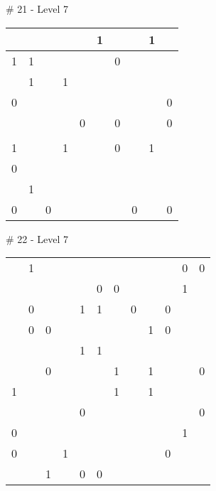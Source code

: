 \# 21 - Level 7 \newline
\begin{tabular}{|m{\collen}|m{\collen}|m{\collen}|m{\collen}|m{\collen}|m{\collen}|m{\collen}|m{\collen}|m{\collen}|m{\collen}|}
\hline
    &   &   &   &   & 1 &   &   & 1 &   \\
\hline
  1 & 1 &   &   &   &   & 0 &   &   &   \\
\hline
    & 1 &   & 1 &   &   &   &   &   &   \\
\hline
  0 &   &   &   &   &   &   &   &   & 0 \\
\hline
    &   &   &   & 0 &   & 0 &   &   & 0 \\
\hline
    &   &   &   &   &   &   &   &   &   \\
\hline
  1 &   &   & 1 &   &   & 0 &   & 1 &   \\
\hline
  0 &   &   &   &   &   &   &   &   &   \\
\hline
    & 1 &   &   &   &   &   &   &   &   \\
\hline
  0 &   & 0 &   &   &   &   & 0 &   & 0 \\
\hline
\end{tabular}


\medskip

\# 22 - Level 7 \newline
\begin{tabular}{|m{\collen}|m{\collen}|m{\collen}|m{\collen}|m{\collen}|m{\collen}|m{\collen}|m{\collen}|m{\collen}|m{\collen}|m{\collen}|m{\collen}|}
\hline
    &   &   &   &   &   &   &   &   &   &   &   \\
\hline
    & 1 &   &   &   &   &   &   &   &   & 0 & 0 \\
\hline
    &   &   &   &   & 0 & 0 &   &   &   & 1 &   \\
\hline
    & 0 &   &   & 1 & 1 &   & 0 &   & 0 &   &   \\
\hline
    & 0 & 0 &   &   &   &   &   & 1 & 0 &   &   \\
\hline
    &   &   &   & 1 & 1 &   &   &   &   &   &   \\
\hline
    &   & 0 &   &   &   & 1 &   & 1 &   &   & 0 \\
\hline
  1 &   &   &   &   &   & 1 &   & 1 &   &   &   \\
\hline
    &   &   &   & 0 &   &   &   &   &   &   & 0 \\
\hline
  0 &   &   &   &   &   &   &   &   &   & 1 &   \\
\hline
  0 &   &   & 1 &   &   &   &   &   & 0 &   &   \\
\hline
    &   & 1 &   & 0 & 0 &   &   &   &   &   &   \\
\hline
\end{tabular}


